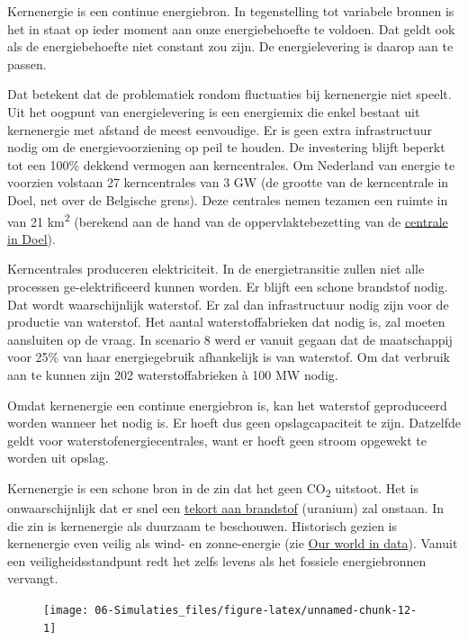 \documentclass[
  11pt,
  a4paper,
]{book}
\begin{document}
Kernenergie is een continue energiebron. In tegenstelling tot variabele bronnen is het in staat op ieder moment aan onze energiebehoefte te voldoen. Dat geldt ook als de energiebehoefte niet constant zou zijn. De energielevering is daarop aan te passen.

Dat betekent dat de problematiek rondom fluctuaties bij kernenergie niet speelt. Uit het oogpunt van energielevering is een energiemix die enkel bestaat uit kernenergie met afstand de meest eenvoudige. Er is geen extra infrastructuur nodig om de energievoorziening op peil te houden. De investering blijft beperkt tot een 100\% dekkend vermogen aan kerncentrales. Om Nederland van energie te voorzien volstaan 27 kerncentrales van 3 GW (de grootte van de kerncentrale in Doel, net over de Belgische grens). Deze centrales nemen tezamen een ruimte in van 21 km\textsuperscript{2} (berekend aan de hand van de oppervlaktebezetting van de \href{https://nl.wikipedia.org/wiki/Kerncentrale_Doel}{centrale in Doel}).

Kerncentrales produceren elektriciteit. In de energietransitie zullen niet alle processen ge-elektrificeerd kunnen worden. Er blijft een schone brandstof nodig. Dat wordt waarschijnlijk waterstof. Er zal dan infrastructuur nodig zijn voor de productie van waterstof. Het aantal waterstoffabrieken dat nodig is, zal moeten aansluiten op de vraag. In scenario 8 werd er vanuit gegaan dat de maatschappij voor 25\% van haar energiegebruik afhankelijk is van waterstof. Om dat verbruik aan te kunnen zijn 202 waterstoffabrieken à 100 MW nodig.

Omdat kernenergie een continue energiebron is, kan het waterstof geproduceerd worden wanneer het nodig is. Er hoeft dus geen opslagcapaciteit te zijn. Datzelfde geldt voor waterstofenergiecentrales, want er hoeft geen stroom opgewekt te worden uit opslag.

Kernenergie is een schone bron in de zin dat het geen CO\textsubscript{2} uitstoot. Het is onwaarschijnlijk dat er snel een \href{https://www.scientificamerican.com/article/how-long-will-global-uranium-deposits-last/}{tekort aan brandstof} (uranium) zal onstaan. In die zin is kernenergie als duurzaam te beschouwen. Historisch gezien is kernenergie even veilig als wind- en zonne-energie (zie \href{https://ourworldindata.org/safest-sources-of-energy}{Our world in data}). Vanuit een veiligheidsstandpunt redt het zelfs levens als het fossiele energiebronnen vervangt.

\begin{figure}

{\centering \texttt{[image: 06-Simulaties\_files/figure-latex/unnamed-chunk-12-1]} 

}

\end{figure}
\end{document}
